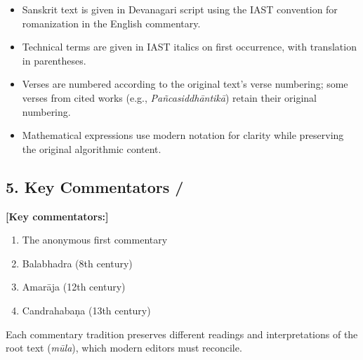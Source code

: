 \documentclass[10pt,a4paper]{article}
\begin{document}
\begin{itemize}
\item Sanskrit text is given in Devanagari script using the IAST convention for
romanization in the English commentary.
\item Technical terms are given in IAST italics on first occurrence, with
translation in parentheses.
\item Verses are numbered according to the original text's verse numbering;
some verses from cited works (e.g., \textit{Pañcasiddhāntikā}) retain their original numbering.
\item Mathematical expressions use modern notation for clarity while preserving
the original algorithmic content.
\end{itemize}

\vspace{1.5em}

\subsection*{5. Key Commentators / }

\begin{minipage}[t]{0.47\textwidth}
\end{minipage}%
\hfill\vline\hfill%
\begin{minipage}[t]{0.47\textwidth}
\textbf{[Key commentators:]}
\begin{enumerate}
\item The anonymous first commentary
\item Balabhadra (8th century)
\item Amarāja (12th century)
\item Candrahabaṇa (13th century)
\end{enumerate}
Each commentary tradition preserves different readings and interpretations of
the root text (\textit{mūla}), which modern editors must reconcile.
\end{minipage}

\vspace{2em}

\vfill
\end{document}
